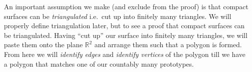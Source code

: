 An important assumption we make (and exclude from the proof) is that
compact surfaces can be \emph{triangulated} i.e.\ cut up into finitely
many triangles. We will properly define triangulation later, but to
see a proof that compact surfaces can be triangulated. Having ``cut up'' our surface into finitely many triangles, we will
paste them onto the plane $\mathbb{R}^2$ and arrange them such that a
polygon is formed. From here we will \emph{identify edges} and
\emph{identify vertices} of the polygon till we have a polygon that
matches one of our countably many prototypes.




